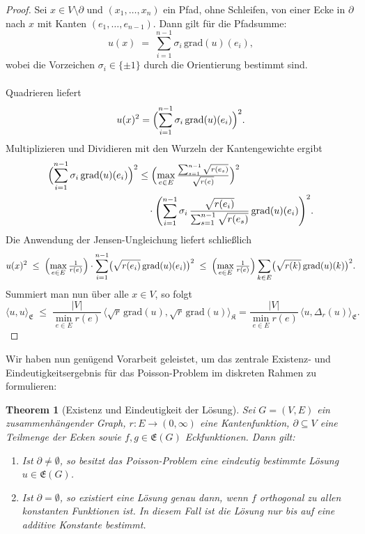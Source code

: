 \documentclass[11pt,a4paper,leqno]{report}
\newtheorem{theorem}{Theorem}[chapter]
\numberwithin{equation}{chapter}
\begin{document}
\begin{proof}
	Sei $x \in V \setminus \partial$ und $(x_1, \dots, x_n)$ ein Pfad, ohne Schleifen, 
	von einer Ecke in $\partial$ nach $x$ mit Kanten $(e_1,\dots,e_{n-1})$. 
	Dann gilt für die Pfadsumme:
	\[
	u(x) \;=\; \sum_{i=1}^{n-1} \sigma_i \, \mathrm{grad}(u)(e_i),
	\]
	wobei die Vorzeichen $\sigma_i \in \{\pm 1\}$ durch die Orientierung bestimmt sind. \\
	\\
	Quadrieren liefert
	\[
	u(x)^2 = \Bigl(\sum_{i=1}^{n-1} \sigma_i \, \mathrm{grad}(u)(e_i)\Bigr)^2.
	\]
	Multiplizieren und Dividieren mit den Wurzeln der Kantengewichte ergibt
	\begin{align*}
		\Bigl(\sum_{i=1}^{n-1} \sigma_i \,\mathrm{grad}(u)(e_i)\Bigr)^2 
		&\leq 
		\Bigl(\max_{e\in E}\tfrac{\sum_{s=1}^{n-1}\sqrt{r(e_s)}}{\sqrt{r(e)}}\Bigr)^2 \\
		&\quad \cdot \Biggl(\sum_{i=1}^{n-1} 
		\sigma_i \,\frac{\sqrt{r(e_i)}}{\sum_{s=1}^{n-1}\sqrt{r(e_s)}}
		\,\mathrm{grad}(u)(e_i)\Biggr)^2.
	\end{align*}
	Die Anwendung der Jensen-Ungleichung liefert schließlich
	\[
	u(x)^2 \;\leq\; 
	\Bigl(\max_{e\in E} \tfrac{1}{r(e)}\Bigr) 
	\cdot \sum_{i=1}^{n-1} \bigl(\sqrt{r(e_i)} \, \mathrm{grad}(u)(e_i)\bigr)^2
	\;\leq\;
	\Bigl(\max_{e\in E} \tfrac{1}{r(e)}\Bigr) 
	\sum_{k\in E} \bigl(\sqrt{r(k)}\,\mathrm{grad}(u)(k)\bigr)^2.
	\]
	Summiert man nun über alle $x \in V$, so folgt
	\[
	\langle u, u \rangle_{\mathfrak{E}}
	\;\leq\; \frac{|V|}{\min_{e\in E} r(e)} \,
	\langle \sqrt{r}\,\mathrm{grad}(u), \sqrt{r}\,\mathrm{grad}(u)\rangle_{\mathfrak{K}}
	= \frac{|V|}{\min_{e\in E} r(e)} \,
	\langle u, \Delta_r(u) \rangle_{\mathfrak{E}}.
	\]
\end{proof}
\noindent
Wir haben nun genügend Vorarbeit geleistet, 
um das zentrale Existenz- und Eindeutigkeitsergebnis 
für das Poisson-Problem im diskreten Rahmen zu formulieren:
\begin{theorem}[Existenz und Eindeutigkeit der Lösung]
	Sei $G=(V,E)$ ein zusammenhängender Graph, $r:E\to(0,\infty)$ eine Kantenfunktion, 
	$\partial \subseteq V$ eine Teilmenge der Ecken sowie 
	$f,g \in \mathfrak{E}(G)$ Eckfunktionen. 
	Dann gilt:
	\begin{enumerate}
		\item Ist $\partial \neq \emptyset$, so besitzt das Poisson-Problem 
		eine eindeutig bestimmte Lösung $u \in \mathfrak{E}(G)$. 
		\item Ist $\partial = \emptyset$, so existiert eine Lösung genau dann, 
		wenn $f$ orthogonal zu allen konstanten Funktionen ist. 
		In diesem Fall ist die Lösung nur bis auf eine additive Konstante bestimmt.
	\end{enumerate}
\end{theorem}
\end{document}

